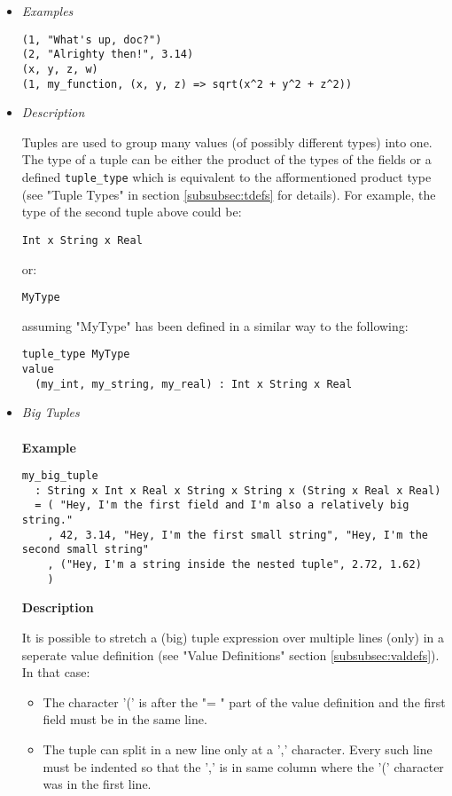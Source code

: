 \documentclass{article}
\begin{document}
\begin{itemize}

\item \textit{Examples}
\begin{verbatim}
(1, "What's up, doc?")
(2, "Alrighty then!", 3.14)
(x, y, z, w)
(1, my_function, (x, y, z) => sqrt(x^2 + y^2 + z^2))
\end{verbatim}

\item \textit{Description} 

Tuples are used to group many values (of possibly different types) into one.
The type of a tuple can be either the product of the types of the fields or a
defined \texttt{tuple_type} which is equivalent to the afformentioned product
type (see "Tuple Types" in section \ref{subsubsec:tdefs} for details). For
example, the type of the second tuple above could be:
\begin{verbatim}
Int x String x Real
\end{verbatim}
or:
\begin{verbatim}
MyType
\end{verbatim}
assuming "MyType" has been defined in a similar way to the following:
\begin{verbatim}
tuple_type MyType
value
  (my_int, my_string, my_real) : Int x String x Real
\end{verbatim}

\item \textit{Big Tuples}
\\\\
\textbf{Example}
\begin{verbatim}
my_big_tuple
  : String x Int x Real x String x String x (String x Real x Real)
  = ( "Hey, I'm the first field and I'm also a relatively big string."
    , 42, 3.14, "Hey, I'm the first small string", "Hey, I'm the second small string"
    , ("Hey, I'm a string inside the nested tuple", 2.72, 1.62)
    )
\end{verbatim}

\textbf{Description}

It is possible to stretch a (big) tuple expression over multiple lines (only)
in a seperate value definition (see "Value Definitions" section
\ref{subsubsec:valdefs}).  In that case:
\begin{itemize}
\item
The character '(' is after the "= " part of the value definition
and the first field must be in the same line.

\item
The tuple can split in a new line only at a ',' character. Every such line must
be indented so that the ',' is in same column where the '(' character was in
the first line.


\end{itemize}
\end{itemize}
\end{document}
